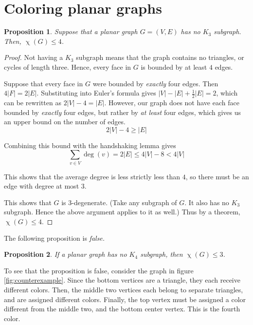 \documentclass[12pt,letterpaper]{article}
\newcommand{\question}{\section}
\newtheorem{prop}{Proposition}
\DeclareMathOperator{\degOp}{deg}
\newcommand{\parens}[1]{\left(#1\right)}
\renewcommand{\deg}[1]{\degOp{\parens{#1}}}
\DeclareMathOperator{\chromOp}{\chi}
\newcommand{\chrom}[1]{\chromOp{\parens{#1}}}
\newcommand{\half}{\frac{1}{2}}
\begin{document}
\question{Coloring planar graphs}

\begin{prop}
    Suppose that a planar graph $G = (V, E)$ has no $K_3$ subgraph.
    Then, $\chrom{G} \leq 4$.
\end{prop}

\begin{proof}
    Not having a $K_3$ subgraph means that the graph contains no triangles, or
    cycles of length three. Hence, every face in $G$ is bounded by at least $4$
    edges.

    Suppose that every face in $G$ were bounded by \emph{exactly} four edges.
    Then $4|F| = 2|E|$.
    Substituting into Euler's formula gives $|V| - |E| + \half |E| = 2$, which
    can be rewritten as $2|V| - 4 = |E|$. However, our graph does not have each
    face bounded by \emph{exactly} four edges, but rather by \emph{at least}
    four edges, which gives us an upper bound on the number of edges.
    \begin{equation}
        \label{eq:edge-upper-bound}
        2|V| - 4 \geq |E|
    \end{equation}

    Combining this bound with the handshaking lemma gives
    \begin{equation}
        \label{eq:bounded-handshake}
        \sum_{v \in V} \deg{v} = 2 |E| \leq 4 |V| - 8 < 4 |V|
    \end{equation}

    This shows that the average degree is less strictly less than $4$, so there
    must be an edge with degree at most $3$.

    This shows that $G$ is $3$-degenerate. (Take any subgraph of $G$. It also
    has no $K_3$ subgraph. Hence the above argument applies to it as well.)
    Thus by a theorem, $\chrom{G} \leq 4$.
\end{proof}

The following proposition is \emph{false.}

\begin{prop}
    If a planar graph has no $K_4$ subgraph, then $\chrom{G} \leq 3$.
\end{prop}

To see that the proposition is false, consider the graph in figure
\ref{fig:counterexample}. Since the bottom vertices are a triangle, they each
receive different colors. Then, the middle two vertices each belong to separate
triangles, and are assigned different colors. Finally, the top vertex must be
assigned a color different from the middle two, and the bottom center vertex.
This is the fourth color.
\end{document}
